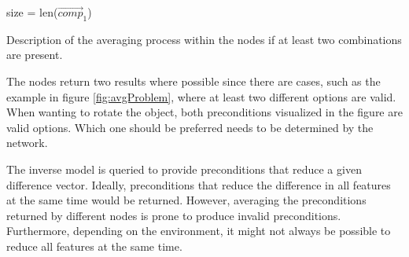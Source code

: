 \begin{algorithm}
	\BlankLine
	size = len($\vec{comp}_1$) \\
	\caption{Description of the averaging process within the nodes if at least two combinations are present.}
	\label{alg:averaging}
\end{algorithm}

The nodes return two results where possible since there are cases, such as the example in figure \ref{fig:avgProblem}, where at least two different options are valid. When wanting to rotate the object, both preconditions visualized in the figure are valid options. Which one should be preferred needs to be determined by the network.

The inverse model is queried to provide preconditions that reduce a given difference vector. Ideally, preconditions that reduce the difference in all features at the same time would be returned. However, averaging the preconditions returned by different nodes is prone to produce invalid preconditions. Furthermore, depending on the environment, it might not always be possible to reduce all features at the same time. 

